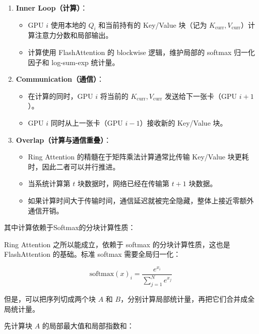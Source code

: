 \begin{enumerate}
\def\labelenumi{\arabic{enumi}.}
\tightlist
\item
{}
  \textbf{Inner Loop（计算）}：

  \begin{itemize}
  \tightlist
  \item
    GPU \(i\) 使用本地的 \(Q_i\) 和当前持有的 Key/Value 块（记为 \(K_{\mathrm{curr}}, V_{\mathrm{curr}}\)）计算注意力分数和局部输出。
  \item
    计算使用 FlashAttention 的 blockwise 逻辑，维护局部的 softmax 归一化因子和 log-sum-exp 统计量。
  \end{itemize}
\item
{}
  \textbf{Communication（通信）}：

  \begin{itemize}
  \tightlist
  \item
    在计算的同时，GPU \(i\) 将当前的 \(K_{\mathrm{curr}}, V_{\mathrm{curr}}\) 发送给下一张卡（GPU \(i+1\)）。
  \item
    GPU \(i\) 同时从上一张卡（GPU \(i-1\)）接收新的 Key/Value 块。
  \end{itemize}
\item
{}
  \textbf{Overlap（计算与通信重叠）}：

  \begin{itemize}
  \tightlist
  \item
    Ring Attention 的精髓在于矩阵乘法计算通常比传输 Key/Value 块更耗时，因此二者可以并行推进。
  \item
    当系统计算第 \(t\) 块数据时，网络已经在传输第 \(t+1\) 块数据。
  \item
    如果计算时间大于传输时间，通信延迟就被完全隐藏，整体上接近零额外通信开销。
  \end{itemize}
\end{enumerate}

其中计算依赖于Softmax的分块计算性质：

Ring Attention 之所以能成立，依赖于 softmax 的分块计算性质，这也是 FlashAttention 的基础。标准 softmax 需要全局归一化：

\[
\mathrm{softmax}(x)_i = \frac{e^{x_i}}{\sum_{j=1}^{N} e^{x_j}}
\]

但是，可以把序列切成两个块 \(A\) 和 \(B\)，分别计算局部统计量，再把它们合并成全局统计量。

先计算块 \(A\) 的局部最大值和局部指数和：


